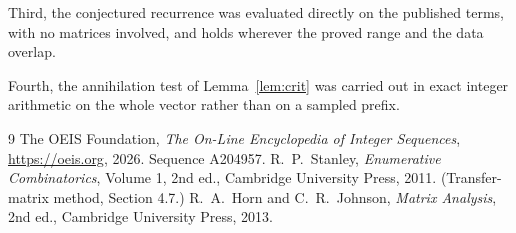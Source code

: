 \documentclass[11pt,a4paper]{article}
\theoremstyle{plain}
\theoremstyle{definition}
\begin{document}
Third, the conjectured recurrence was evaluated directly on the published terms, with no
matrices involved, and holds wherever the proved range and the data overlap.

Fourth, the annihilation test of Lemma~\ref{lem:crit} was carried out in exact integer
arithmetic on the whole vector rather than on a sampled prefix.

\begin{thebibliography}{9}
 The OEIS Foundation, \emph{The On-Line Encyclopedia of Integer
Sequences}, \url{https://oeis.org}, 2026. Sequence A204957.
 R.~P.~Stanley, \emph{Enumerative Combinatorics}, Volume 1, 2nd ed.,
Cambridge University Press, 2011. (Transfer-matrix method, Section 4.7.)
 R.~A.~Horn and C.~R.~Johnson, \emph{Matrix Analysis}, 2nd ed., Cambridge
University Press, 2013.
\end{thebibliography}
\end{document}
